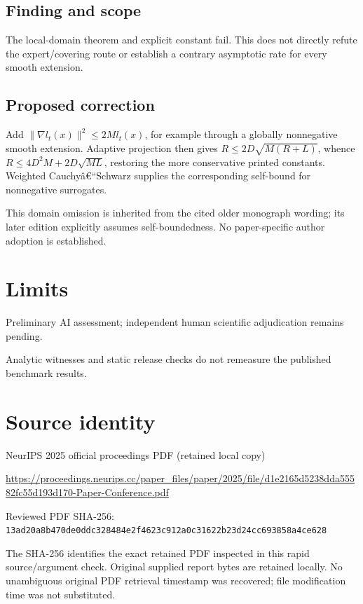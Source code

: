 \documentclass[11pt]{article}
\begin{document}
\subsection*{Finding and scope}

The local-domain theorem and explicit constant fail. This does not directly refute the expert/covering route or establish a contrary asymptotic rate for every smooth extension.

\subsection*{Proposed correction}

Add \(\|\nabla l_t(x)\|^2\le2Ml_t(x)\), for example through a globally nonnegative smooth extension. Adaptive projection then gives \(R\le2D\sqrt{M(R+L)}\), whence \(R\le4D^2M+2D\sqrt{ML}\), restoring the more conservative printed constants. Weighted Cauchyâ€“Schwarz supplies the corresponding self-bound for nonnegative surrogates.

This domain omission is inherited from the cited older monograph wording; its later edition explicitly assumes self-boundedness. No paper-specific author adoption is established.

\section*{Limits}

Preliminary AI assessment; independent human scientific adjudication remains pending.\par

Analytic witnesses and static release checks do not remeasure the published benchmark results.\par

\section*{Source identity}

NeurIPS 2025 official proceedings PDF (retained local copy)

\url{https://proceedings.neurips.cc/paper_files/paper/2025/file/d1e2165d5238dda55582fc55d193d170-Paper-Conference.pdf}

Reviewed PDF SHA-256: \nolinkurl{13ad20a8b470de0ddc328484e2f4623c912a0c31622b23d24cc693858a4ce628}

The SHA-256 identifies the exact retained PDF inspected in this rapid source/argument check. Original supplied report bytes are retained locally. No unambiguous original PDF retrieval timestamp was recovered; file modification time was not substituted.
\end{document}
